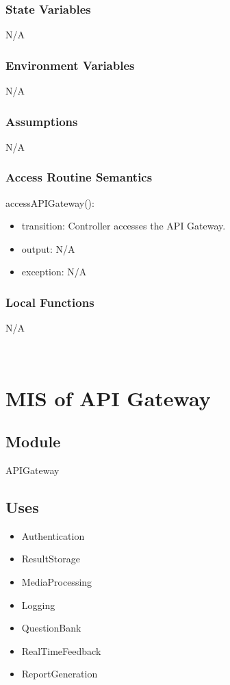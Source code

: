 \documentclass[12pt, titlepage]{article}
\begin{document}
\subsubsection{State Variables}
N/A

\subsubsection{Environment Variables}
N/A

\subsubsection{Assumptions}
N/A

\subsubsection{Access Routine Semantics}

\noindent accessAPIGateway():
\begin{itemize}
\item transition: Controller accesses the API Gateway.
\item output: N/A
\item exception: N/A
\end{itemize}

\subsubsection{Local Functions}
N/A

~\newpage

\section{MIS of API Gateway \label{mAppController} }

\subsection{Module}

APIGateway

\subsection{Uses}

\begin{itemize}
  \item Authentication
  \item ResultStorage
  \item MediaProcessing
  \item Logging
  \item QuestionBank
  \item RealTimeFeedback
  \item ReportGeneration
\end{itemize}
\end{document}
